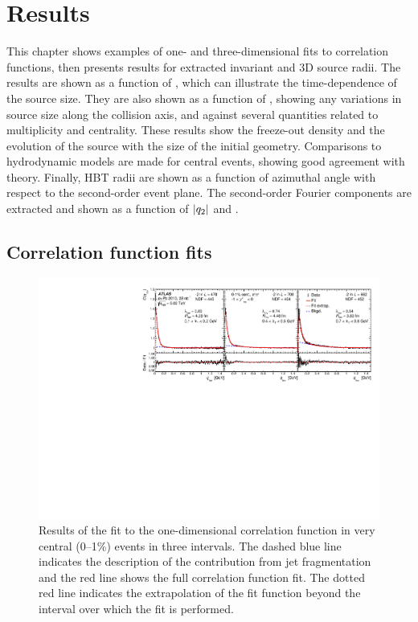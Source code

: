 \chapter{Results}
\label{ch:results}
\graphicspath{{Chapter-Results/figures/}}

This chapter shows examples of one- and three-dimensional fits to correlation functions, then presents results for extracted invariant and 3D source radii.
The results are shown as a function of \kt, which can illustrate the time-dependence of the source size.
They are also shown as a function of \kys, showing any variations in source size along the collision axis, and against several quantities related to multiplicity and centrality.
These results show the freeze-out density and the evolution of the source with the size of the initial geometry.
Comparisons to hydrodynamic models are made for central events, showing good agreement with theory.
Finally, HBT radii are shown as a function of azimuthal angle with respect to the second-order event plane.
The second-order Fourier components are extracted and shown as a function of $|q_{2}|$ and \kt.


\section{Correlation function fits}
\begin{figure}[t]
\centering
\includegraphics[width=\linewidth]{Cqinv_kt_cent0_e3_kys1.pdf}
\caption{Results of the fit to the one-dimensional correlation function in very central (0--1\%) events in three \kt intervals.
The dashed blue line indicates the description of the contribution from jet fragmentation and the red line shows the full correlation function fit.
The dotted red line indicates the extrapolation of the fit function beyond the interval over which the fit is performed.
}
\label{fig:cqinv_cent0}
\end{figure}

